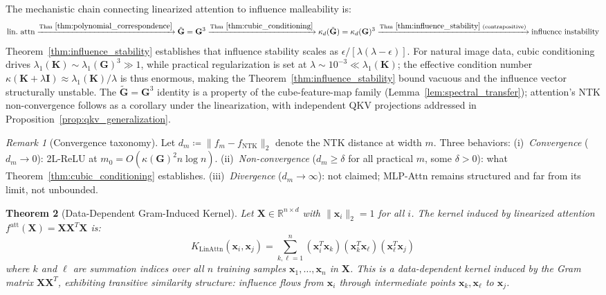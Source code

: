 \documentclass{article}
\theoremstyle{plain}
\newtheorem{theorem}{Theorem}[section]
\theoremstyle{definition}
\theoremstyle{remark}
\newtheorem{remark}[theorem]{Remark}
\newcommand{\R}{\mathbb{R}}
\begin{document}
The mechanistic chain connecting linearized attention to influence malleability is:
$$\text{lin.\ attn} \xrightarrow{\text{Thm}~\ref{thm:polynomial_correspondence}} \tilde{\mathbf{G}} = \mathbf{G}^3 \xrightarrow{\text{Thm}~\ref{thm:cubic_conditioning}} \kappa_d(\tilde{\mathbf{G}}) = \kappa_d(\mathbf{G})^3 \xrightarrow{\text{Thm}~\ref{thm:influence_stability}\text{ (contrapositive)}} \text{influence instability}$$
Theorem~\ref{thm:influence_stability} establishes that influence stability scales as $\epsilon/[\lambda(\lambda-\epsilon)]$. For natural image data, cubic conditioning drives $\lambda_1(\mathbf{K}) \sim \lambda_1(\mathbf{G})^3 \gg 1$, while practical regularization is set at $\lambda \sim 10^{-3} \ll \lambda_1(\mathbf{K})$; the effective condition number $\kappa(\mathbf{K}+\lambda\mathbf{I}) \approx \lambda_1(\mathbf{K})/\lambda$ is thus enormous, making the Theorem~\ref{thm:influence_stability} bound vacuous and the influence vector structurally unstable.
The $\tilde{\mathbf{G}}=\mathbf{G}^3$ identity is a property of the cube-feature-map family (Lemma~\ref{lem:spectral_transfer}); attention's NTK non-convergence follows as a corollary under the linearization, with independent QKV projections addressed in Proposition~\ref{prop:qkv_generalization}.

\begin{remark}[Convergence taxonomy]
\label{rmk:convergence_cases}
Let $d_m \coloneq \|f_m - f_{\text{NTK}}\|_2$ denote the NTK distance at width $m$. Three behaviors: (i)~\emph{Convergence} ($d_m \to 0$): 2L-ReLU at $m_0 = O(\kappa(\mathbf{G})^2 n\log n)$. (ii)~\emph{Non-convergence} ($d_m \geq \delta$ for all practical $m$, some $\delta>0$): what Theorem~\ref{thm:cubic_conditioning} establishes. (iii)~\emph{Divergence} ($d_m \to \infty$): not claimed; MLP-Attn remains structured and far from its limit, not unbounded.
\end{remark}

\begin{theorem}[Data-Dependent Gram-Induced Kernel]
\label{thm:polynomial_correspondence}
Let $\mathbf{X} \in \R^{n \times d}$ with $\|\mathbf{x}_i\|_2 = 1$ for all $i$. The kernel induced by linearized attention $f^{\text{att}}(\mathbf{X}) = \mathbf{X}\mathbf{X}^T\mathbf{X}$ is:
\begin{equation}
K_{\text{LinAttn}}(\mathbf{x}_i, \mathbf{x}_j) = \sum_{k,\ell=1}^{n} (\mathbf{x}_i^T \mathbf{x}_k)(\mathbf{x}_k^T \mathbf{x}_\ell)(\mathbf{x}_\ell^T \mathbf{x}_j)
\end{equation}
where $k$ and $\ell$ are summation indices over all $n$ training samples $\mathbf{x}_1, \ldots, \mathbf{x}_n$ in $\mathbf{X}$. This is a data-dependent kernel induced by the Gram matrix $\mathbf{X}\mathbf{X}^T$, exhibiting transitive similarity structure: influence flows from $\mathbf{x}_i$ through intermediate points $\mathbf{x}_k, \mathbf{x}_\ell$ to $\mathbf{x}_j$.
\end{theorem}
\end{document}
